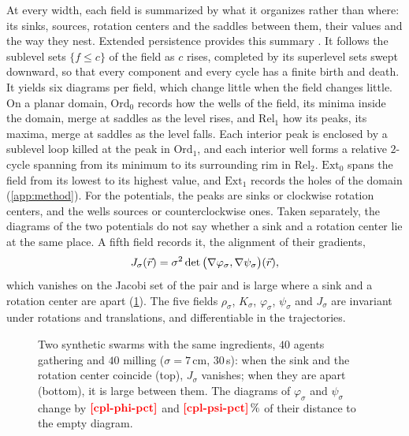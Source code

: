 \documentclass[pdflatex,sn-apa]{sn-jnl}
\begin{document}
At every width, each field is summarized by what it organizes rather than where: its sinks, sources, rotation centers
and the saddles between them, their values and the way they nest. Extended persistence provides this summary
\citep{cohen2009extending}. It follows the sublevel sets $\{f\le c\}$ of the field as $c$ rises, completed by its
superlevel sets swept downward, so that every component and every cycle has a finite birth and death. It yields six
diagrams per field, which change little when the field changes little. On a planar domain, $\mathrm{Ord}_0$ records how
the wells of the field, its minima inside the domain, merge at saddles as the level rises, and $\mathrm{Rel}_1$ how its
peaks, its maxima, merge at saddles as the level falls. Each interior peak is enclosed by a sublevel loop killed at the peak in $\mathrm{Ord}_1$, and each
interior well forms a relative $2$-cycle spanning from its minimum to its surrounding rim in $\mathrm{Rel}_2$.
$\mathrm{Ext}_0$ spans the field from its lowest to its highest value, and $\mathrm{Ext}_1$ records the holes
of the domain (\cref{app:method}). For the potentials, the peaks are sinks or clockwise rotation centers, and the wells
sources or counterclockwise ones. Taken separately, the diagrams of the two
potentials do not say whether a sink and a rotation center lie at the same place. A fifth field records it, the
alignment of their gradients,
\begin{equation}
J_\sigma(\vec{r})=\sigma^2\det\big(\nabla\varphi_\sigma,\nabla\psi_\sigma\big)(\vec{r}),
\label{eq:jacobi}
\end{equation}
which vanishes on the Jacobi set of the pair \citep{edelsbrunner2004jacobi} and is large where a sink and a rotation
center are apart (\cref{fig:potentials}). The five fields $\rho_\sigma$, $K_\sigma$, $\varphi_\sigma$, $\psi_\sigma$
and $J_\sigma$ are invariant under rotations and translations, and differentiable in the trajectories.

\begin{figure}[!htbp]
\centering
{}
\caption{Two synthetic swarms with the same ingredients, $40$ agents gathering and $40$ milling ($\sigma=7$\,cm,
$30$\,s): when the sink and the rotation center coincide (top), $J_\sigma$ vanishes; when they are apart (bottom), it
is large between them. The diagrams of $\varphi_\sigma$ and $\psi_\sigma$ change by $\nm{cpl-phi-pct}$ and
$\nm{cpl-psi-pct}\,\%$ of their distance to the empty diagram.}
\label{fig:potentials}
\end{figure}
\end{document}
